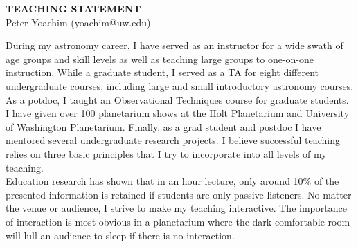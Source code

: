 \documentclass[11pt]{article}
\begin{document}
\pagestyle{fancy}
\lhead{\textcolor{gray}{\it Peter Yoachim}}
\rhead{\textcolor{gray}{\thepage/\totalpages{}}}
\renewcommand{\headrulewidth}{0pt}
\renewcommand{\footrulewidth}{0pt}
\fancyfoot[C]{\footnotesize \textcolor{gray}{http://staff.washington.edu/yoachim/}}




\begin{center}
{\Large \bf TEACHING STATEMENT}\\
\vspace*{0.1cm}
{\normalsize Peter Yoachim (yoachim@uw.edu)}
\end{center}



During my astronomy career, I have served as an instructor for a wide swath of age groups and skill levels as well as teaching large groups to one-on-one instruction.  
While a graduate student, I served as a TA for eight different undergraduate courses, including large and small introductory astronomy courses.  As a potdoc, I taught an Observational Techniques course for graduate students.
I have given over 100 planetarium shows at the Holt Planetarium and University of Washington Planetarium.      
Finally, as a grad student and postdoc I have mentored several undergraduate research projects.
I believe successful teaching relies on three basic principles that I try to incorporate into all levels of my teaching.\\





  Education research has shown that in an hour lecture, only around 10\% of the presented information is retained if students are only passive listeners.  No matter the venue or audience, I strive to make my teaching interactive.  The importance of interaction is most obvious in a planetarium where the dark comfortable room will lull an audience to sleep if there is no interaction.  
\end{document}
